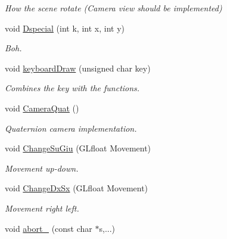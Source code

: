 \begin{DoxyCompactItemize}
\begin{DoxyCompactList}\small\item\em How the scene rotate (Camera view should be implemented) \end{DoxyCompactList}\item 
void \hyperlink{classDraw_ab63c111588287a2a7ccf27b480f49d06}{Dspecial} (int k, int x, int y)\hypertarget{classDraw_ab63c111588287a2a7ccf27b480f49d06}{}\label{classDraw_ab63c111588287a2a7ccf27b480f49d06}

\begin{DoxyCompactList}\small\item\em Boh. \end{DoxyCompactList}\item 
void \hyperlink{classDraw_a60d9d96dd62e71bfe22654f9d58f834b}{keyboard\+Draw} (unsigned char key)\hypertarget{classDraw_a60d9d96dd62e71bfe22654f9d58f834b}{}\label{classDraw_a60d9d96dd62e71bfe22654f9d58f834b}

\begin{DoxyCompactList}\small\item\em Combines the key with the functions. \end{DoxyCompactList}\item 
void \hyperlink{classDraw_aabbfd9c8269f5409bd80617f17ee17a6}{Camera\+Quat} ()\hypertarget{classDraw_aabbfd9c8269f5409bd80617f17ee17a6}{}\label{classDraw_aabbfd9c8269f5409bd80617f17ee17a6}

\begin{DoxyCompactList}\small\item\em Quaternion camera implementation. \end{DoxyCompactList}\item 
void \hyperlink{classDraw_a62cfcd5895c1c14a27f38007fd00ef28}{Change\+Su\+Giu} (G\+Lfloat Movement)\hypertarget{classDraw_a62cfcd5895c1c14a27f38007fd00ef28}{}\label{classDraw_a62cfcd5895c1c14a27f38007fd00ef28}

\begin{DoxyCompactList}\small\item\em Movement up-\/down. \end{DoxyCompactList}\item 
void \hyperlink{classDraw_a8d619bf9e67c2d0684777837c50cd820}{Change\+Dx\+Sx} (G\+Lfloat Movement)\hypertarget{classDraw_a8d619bf9e67c2d0684777837c50cd820}{}\label{classDraw_a8d619bf9e67c2d0684777837c50cd820}

\begin{DoxyCompactList}\small\item\em Movement right left. \end{DoxyCompactList}\item 
void \hyperlink{classDraw_a7fe6a9c0c549657aa0d7da2e3c73fa01}{abort\+\_\+} (const char $\ast$s,...)\hypertarget{classDraw_a7fe6a9c0c549657aa0d7da2e3c73fa01}{}\label{classDraw_a7fe6a9c0c549657aa0d7da2e3c73fa01}


\end{DoxyCompactItemize}
